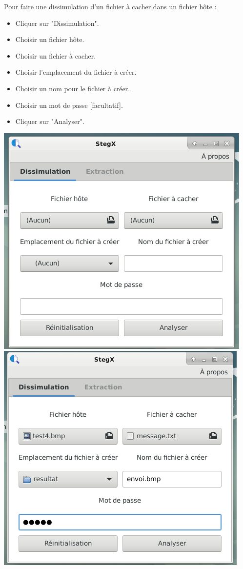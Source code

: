 \documentclass[11pt]{article}
\begin{document}
Pour faire une dissimulation d'un fichier à cacher dans un fichier hôte : 
\begin{itemize}
\item Cliquer sur "Dissimulation".
\item Choisir un fichier hôte. 
\item Choisir un fichier à cacher. 
\item Choisir l'emplacement du fichier à créer. 
\item Choisir un nom pour le fichier à créer. 
\item Choisir un mot de passe [facultatif]. 
\item Cliquer sur "Analyser". 
\end{itemize}

\vspace{0.5cm}
\hspace{-2cm}
\includegraphics[scale=0.8]{pictures/ouverture2.png}
\vspace{1cm}
\hspace{0.2cm}
\includegraphics[scale=0.8]{pictures/insertion_1.png}
\end{document}
